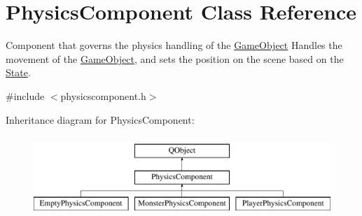 \hypertarget{classPhysicsComponent}{\section{Physics\-Component Class Reference}
\label{classPhysicsComponent}
}


Component that governs the physics handling of the \hyperlink{classGameObject}{Game\-Object} Handles the movement of the \hyperlink{classGameObject}{Game\-Object}, and sets the position on the scene based on the \hyperlink{classState}{State}.  




{\ttfamily \#include $<$physicscomponent.\-h$>$}

Inheritance diagram for Physics\-Component\-:\begin{figure}[H]
\begin{center}
\leavevmode
\includegraphics[height=3.000000cm]{classPhysicsComponent}
\end{center}
\end{figure}
